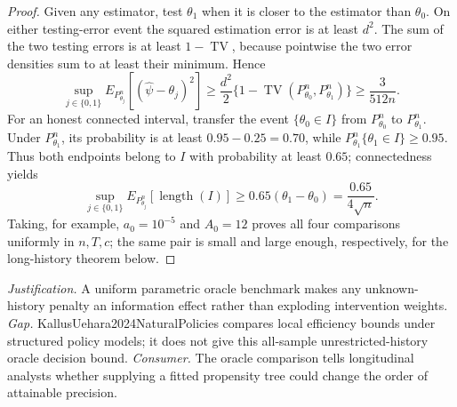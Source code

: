 \documentclass{article}
\begin{document}
\begin{proof}
Given any estimator, test \(\theta_1\) when it is closer to the estimator than \(\theta_0\).  On either testing-error event the squared estimation error is at least \(d^2\).  The sum of the two testing errors is at least \(1-\operatorname{TV}\), because pointwise the two error densities sum to at least their minimum.  Hence
\[
 \sup_{j\in\{0,1\}}E_{P_{\theta_j}^n}[(\widehat\psi-\theta_j)^2]
 \geq\frac{d^2}{2}\{1-\operatorname{TV}(P_{\theta_0}^n,P_{\theta_1}^n)\}
 \geq\frac{3}{512n}.
\]
For an honest connected interval, transfer the event \(\{\theta_0\in I\}\) from \(P_{\theta_0}^n\) to \(P_{\theta_1}^n\).  Under \(P_{\theta_1}^n\), its probability is at least \(0.95-0.25=0.70\), while \(P_{\theta_1}^n\{\theta_1\in I\}\geq0.95\).  Thus both endpoints belong to \(I\) with probability at least \(0.65\); connectedness yields
\[
 \sup_{j\in\{0,1\}}E_{P_{\theta_j}^n}[\operatorname{length}(I)]
 \geq0.65(\theta_1-\theta_0)=\frac{0.65}{4\sqrt n}.
\]
Taking, for example, \(a_0=10^{-5}\) and \(A_0=12\) proves all four comparisons uniformly in \(n,T,c\); the same pair is small and large enough, respectively, for the long-history theorem below.
\end{proof}
\par\smallskip\noindent \textit{Justification.} A uniform parametric oracle benchmark makes any unknown-history penalty an information effect rather than exploding intervention weights. \textit{Gap.} KallusUehara2024NaturalPolicies compares local efficiency bounds under structured policy models; it does not give this all-sample unrestricted-history oracle decision bound. \textit{Consumer.} The oracle comparison tells longitudinal analysts whether supplying a fitted propensity tree could change the order of attainable precision.
\end{document}
